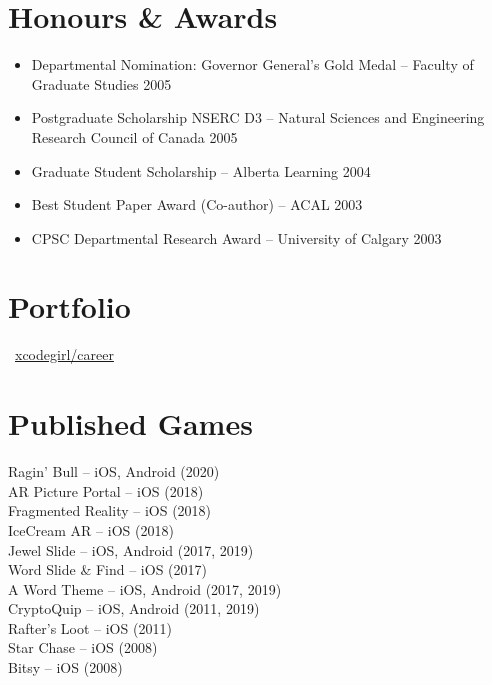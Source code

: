 \documentclass[10pt]{article}
\begin{document}
\section*{Honours \& Awards}
\begin{itemize}[nosep,leftmargin=*]
    \item Departmental Nomination: Governor General's Gold Medal -- Faculty of Graduate Studies \hfill 2005
    \item Postgraduate Scholarship NSERC D3 -- Natural Sciences and Engineering Research Council of Canada \hfill 2005
    \item Graduate Student Scholarship -- Alberta Learning \hfill 2004
    \item Best Student Paper Award (Co-author) -- ACAL \hfill 2003
    \item CPSC Departmental Research Award -- University of Calgary \hfill 2003
\end{itemize}

\section*{Portfolio}
~\href{https://github.com/xcodegirl/career/blob/main/xcodegirl-work-samples.md}{xcodegirl/career}\\

\section*{Published Games}
Ragin' Bull -- iOS, Android (2020)\\
AR Picture Portal -- iOS (2018)\\
Fragmented Reality -- iOS (2018)\\
IceCream AR -- iOS (2018)\\
Jewel Slide -- iOS, Android (2017, 2019)\\
Word Slide \& Find -- iOS (2017)\\
A Word Theme -- iOS, Android (2017, 2019)\\
CryptoQuip -- iOS, Android (2011, 2019)\\
Rafter’s Loot -- iOS (2011)\\
Star Chase -- iOS (2008)\\
Bitsy -- iOS (2008)\\
\end{document}
